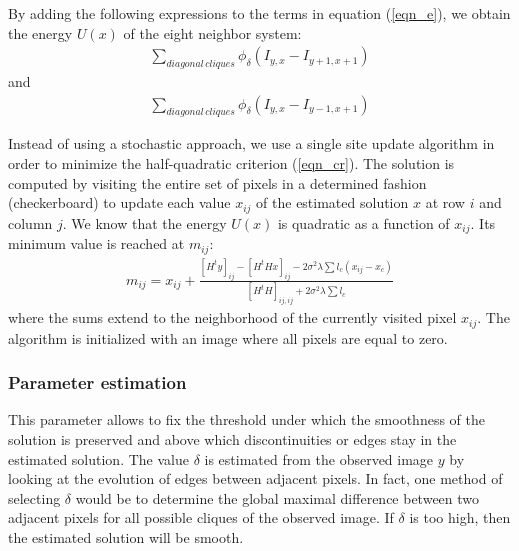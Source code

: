 \documentclass[11pt,a4paper]{article}
\begin{document}
By adding the following expressions to the terms in equation (\ref{eqn_e}), we
obtain the energy $U({x})$ of the eight neighbor system:
\begin{eqnarray} 
\sum_{diagonal\, cliques} \phi_{\delta}(I_{y,x}- I_{y+1,x+1})
\end{eqnarray}
and 
\begin{eqnarray} 
\sum_{diagonal\, cliques} \phi_{\delta}(I_{y,x}- I_{y-1,x+1})
\end{eqnarray}

Instead of using a stochastic approach, we use a single site update algorithm 
\cite{Brette96} in order
to minimize the half-quadratic criterion (\ref{eqn_cr}).
The solution is computed by visiting the entire set of pixels in a determined
fashion (checkerboard) to update each value $x_{ij}$ of the estimated solution
$x$ at row $i$ and column $j$.
We know that the energy $U(x)$ is quadratic as a function of $x_{ij}$.
Its minimum value is reached at $m_{ij}$:
\begin{eqnarray}
m_{ij} = x_{ij} + \frac{[{H^ty}]_{ij} - [{H^tHx}]_{ij} - 2\sigma^2\lambda 
\sum l_c(x_{ij}-x_c)}{[{H^tH}]_{ij,ij} + 2\sigma^2\lambda\sum l_c}
\label{eqn_corr}
\end{eqnarray} 
where the sums extend to the neighborhood of the currently visited pixel $x_{ij}$.
The algorithm is initialized with an image where all pixels are equal to zero.

\subsubsection{Parameter estimation}


This parameter allows to fix the threshold under which the smoothness of the
solution is preserved and above which discontinuities or edges stay in the
estimated solution.
The value $\delta$ is estimated from the observed image $y$ by looking at the
evolution of edges between adjacent pixels. In fact, one method of selecting
$\delta$
would be to determine the global maximal difference between two adjacent pixels 
for all possible cliques of the observed image.
If $\delta$ is too high, then the estimated solution will be smooth.

\end{document}

